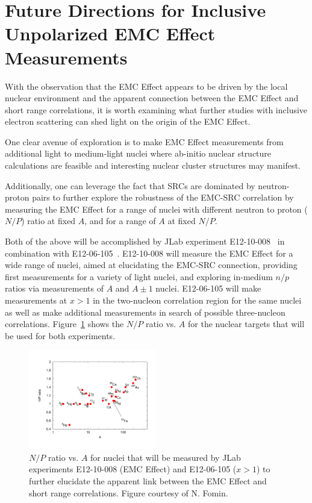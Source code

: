 \section{Future Directions for Inclusive Unpolarized EMC Effect Measurements}

With the observation that the EMC Effect appears to be driven by the local nuclear environment
and the apparent connection between the EMC Effect and short range correlations, it is worth examining what
further studies with inclusive electron scattering can shed light on the origin of the EMC Effect.

One clear avenue of exploration is to make EMC Effect measurements from additional light to medium-light
nuclei where ab-initio nuclear structure calculations are feasible and interesting nuclear cluster
structures may manifest.

Additionally, one can leverage the fact that SRCs are dominated by neutron-proton pairs to further explore
the robustness of the EMC-SRC correlation by measuring the EMC Effect for a range of nuclei with
different neutron to proton ($N/P$) ratio at fixed $A$, and for a range of $A$ at fixed $N/P$.

Both of the above will be accomplished by JLab experiment E12-10-008~\cite{12gev_emc} in combination
with E12-06-105~\cite{12gev_xgt1}. E12-10-008 will measure the EMC Effect for a wide range of nuclei,
aimed at elucidating the EMC-SRC connection, providing first measurements for a variety of light nuclei,
and exploring in-medium $n/p$ ratios via measurements of $A$ and $A\pm1$ nuclei.  E12-06-105 will make
measurements at $x>1$ in the two-nucleon correlation region for the same nuclei as well as make additional
measurements in search of possible three-nucleon correlations. Figure~\ref{fig:np_ratios} shows the $N/P$
ratio vs. $A$ for the nuclear targets that will be used for both experiments.

\begin{figure}[htb]
  \includegraphics[width=0.5\textwidth]{plots/np_ratios_2017.pdf}
  \caption{$N/P$ ratio vs. $A$ for nuclei that will be measured by JLab experiments E12-10-008 (EMC Effect)
    and E12-06-105 ($x>1$) to further elucidate the apparent link between the EMC Effect and short range
    correlations. Figure courtesy of N. Fomin.}
  \label{fig:np_ratios}
\end{figure}